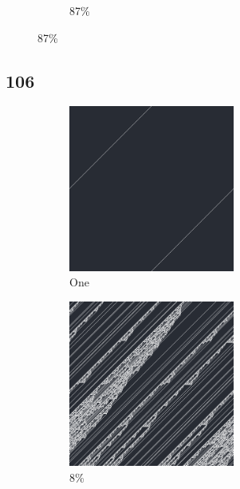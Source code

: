 \documentclass[12pt, fleqn]{report}                             %
\theoremstyle{break}                                            %
\begin{document}
\begin{figure}[ht!]
\begin{subfigure}[b]{0.4\linewidth}
          \caption{87\%}
        \end{subfigure}
      \end{figure}


      \clearpage
      \subsection{106}
      \begin{figure}[ht!]
        \centering
        \begin{subfigure}[b]{0.4\linewidth}
          \includegraphics[width=0.6\textwidth]{Images/106/a.png}
          \caption{One}
        \end{subfigure}
        \begin{subfigure}[b]{0.4\linewidth}
          \includegraphics[width=0.6\textwidth]{Images/106/b.png}
          \caption{8\%}
        \end{subfigure}
        \begin{subfigure}[b]{0.4\linewidth}

\end{subfigure}
\end{figure}
\end{document}
